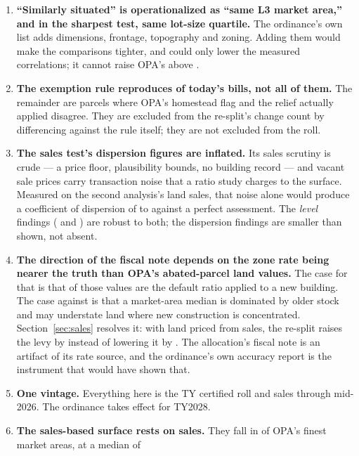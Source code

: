 \documentclass[11pt]{article}
\begin{document}
\begin{enumerate}
\item \textbf{``Similarly situated'' is operationalized as ``same L3 market area,'' and in the
  sharpest test, same lot-size quartile.} The ordinance's own list adds dimensions, frontage,
  topography and zoning. Adding them would make the comparisons tighter, and could only lower the
  measured correlations; it cannot raise OPA's above \LycdUniOPABuildingCorr{}.
\item \textbf{The exemption rule reproduces \LycdReconMatchPct{} of today's bills, not all of them.} The
  remainder are parcels where OPA's homestead flag and the relief actually applied disagree. They
  are excluded from the re-split's change count by differencing against the rule itself; they
  are not excluded from the roll.
\item \textbf{The sales test's dispersion figures are inflated.} Its sales scrutiny is crude
  --- a price floor, plausibility bounds, no building record --- and vacant sale prices carry
  transaction noise that a ratio study charges to the surface. Measured on the second
  analysis's land sales, that noise alone would produce a coefficient of dispersion of
  \LycdNoiseCodLo{} to \LycdNoiseCodHi{} against a perfect assessment. The \emph{level} findings
  (\LycdSalesOPAAgg{} and \LycdSalesLYCDAgg{}) are robust to both; the dispersion findings are
  smaller than shown, not absent.
\item \textbf{The direction of the fiscal note depends on the zone rate being nearer the truth
  than OPA's abated-parcel land values.} The case for that is that \LycdAbatedAtDefaultPct{} of
  those values are the default ratio applied to a new building. The case against is that a
  market-area median is dominated by older stock and may understate land where new construction
  is concentrated. Section~\ref{sec:sales} resolves it: with land priced from sales, the
  re-split raises the levy by \LycdSfiveCLevyAbsM{} instead of lowering it by \LycdCLevyAbsM{}.
  The allocation's fiscal note is an artifact of its rate source, and the ordinance's own
  accuracy report is the instrument that would have shown that.
\item \textbf{One vintage.} Everything here is the TY\LycdTaxYear{} certified roll and sales
  through mid-2026. The ordinance takes effect for TY2028.
\item \textbf{The sales-based surface rests on \LycdWitN{} sales.} They fall in
  \LycdWitGmaThreeZones{} of OPA's finest market areas, at a median of \LycdWitPerGmaThreeMedian{}

\end{enumerate}
\end{document}

